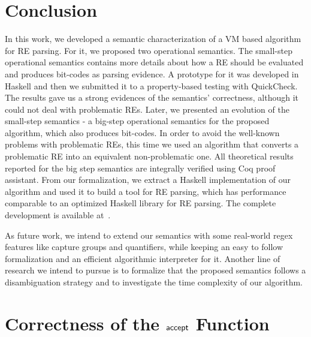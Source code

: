 \documentclass[oneside,12pt]{scrbook}
\theoremstyle{definition}
\newcommand{\F}[1]{\green{\mathsf{#1}}}
\theoremstyle{plain}
\theoremstyle{definition}
\begin{document}




\chapter{Conclusion}\label{chapter:conclusion}

In this work, we developed a semantic characterization of a VM based algorithm for RE parsing. For it, we proposed two operational semantics. The small-step operational semantics contains more details about how a RE should be evaluated and produces bit-codes as parsing evidence. A prototype for it was developed in Haskell and then we submitted it to a property-based testing with QuickCheck. The results gave us a strong evidences of the semantics' correctness, although it could not deal with problematic REs. Later, we presented an evolution of the small-step semantics - a big-step operational semantics for the proposed algorithm, which also produces bit-codes. In order to avoid the well-known problems with problematic REs, this time we used an algorithm that converts a problematic RE into an equivalent non-problematic one. All theoretical results reported for the big step semantics  are integrally verified using Coq proof assistant. From our formalization, we extract a Haskell implementation of our algorithm and used it to build a tool for RE parsing, which has performance comparable to an optimized Haskell library for RE parsing. The complete development is available at~\cite{regexvm-rep}.

As future work, we intend to extend our semantics with some real-world regex features like capture groups and quantifiers, while keeping an easy to follow formalization and an efficient algorithmic interpreter for it. Another line of research we intend to pursue is to formalize that the proposed semantics follows a disambiguation strategy and to investigate the time complexity of our algorithm.




\appendix



\chapter{Correctness of the \ensuremath{\F{accept}} Function}\label{appendix:accept}
\end{document}
